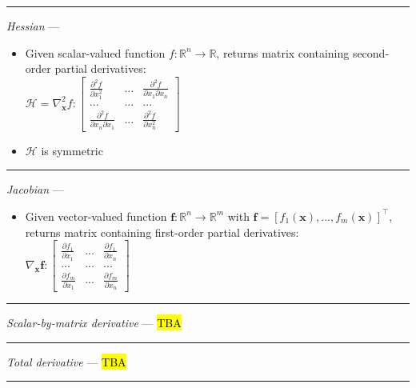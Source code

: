 {\color{lightgray}\hrule height 0.001mm}

\emph{Hessian} --- 
\begin{itemize}
    \item Given scalar-valued function $f: \mathbb{R}^{n} \rightarrow \mathbb{R}$, returns matrix containing second-order partial derivatives:\\
    $\mathcal{H} = \nabla_{\boldsymbol{x}}^2 f: \begin{bmatrix}
    \frac{\partial^2 f}{\partial x_1^2} & ... & \frac{\partial^2 f}{\partial x_1 \partial x_n} \\
    ... & ... & ... \\
    \frac{\partial^2 f}{\partial x_n \partial x_1} & ... & \frac{\partial^2 f}{\partial x_n^2}
    \end{bmatrix}$
    \item $\mathcal{H}$ is symmetric 
\end{itemize}

{\color{lightgray}\hrule height 0.001mm}

\emph{Jacobian} --- 
\begin{itemize}
    \item Given vector-valued function $\boldsymbol{f}: \mathbb{R}^{n} \rightarrow \mathbb{R}^{m}$ with $\boldsymbol{f} = [f_1(\boldsymbol{x}), ..., f_m(\boldsymbol{x})]^\intercal$, returns matrix containing first-order partial derivatives:\\
    $\nabla_{\boldsymbol{x}} \boldsymbol{f}: \begin{bmatrix}
    \frac{\partial f_1}{\partial x_1} & ... & \frac{\partial f_1}{\partial x_n} \\
    ... & ... & ... \\
    \frac{\partial f_m}{\partial x_1} & ... & \frac{\partial f_m}{\partial x_n}
    \end{bmatrix}$
\end{itemize}

{\color{lightgray}\hrule height 0.001mm}

\emph{Scalar-by-matrix derivative} --- \hl{TBA} 

{\color{lightgray}\hrule height 0.001mm}

\emph{Total derivative} --- \hl{TBA} 

{\color{lightgray}\hrule height 0.001mm}

